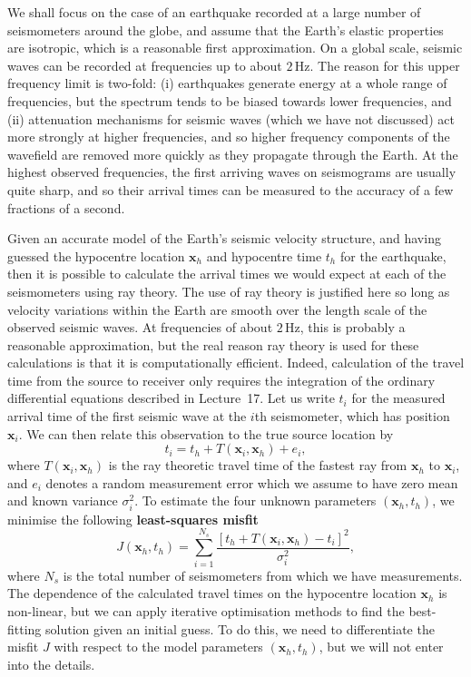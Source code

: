 We shall focus on the case of an earthquake recorded at a large number of seismometers around the globe, and assume that the 
Earth's elastic properties are isotropic, which is a 
reasonable first approximation. On a global scale, seismic waves can be recorded at frequencies up to about $2\,\mathrm{Hz}$. The reason for 
this upper frequency limit is two-fold: (i) earthquakes 
generate energy at a whole range of frequencies, but the spectrum tends to be biased towards lower frequencies, and (ii) attenuation 
mechanisms for seismic waves (which we have not 
discussed) act more strongly at higher frequencies, and so higher frequency components of the wavefield are removed more quickly as 
they propagate through the Earth. At the highest 
observed frequencies, the first arriving waves on seismograms are usually quite sharp, and so their arrival times
 can be measured to the accuracy of a few fractions of a second.

Given an accurate model of the Earth's seismic velocity structure, and having guessed the hypocentre location $\mathbf{x}_{h}$ and 
hypocentre time $t_{h}$ for the earthquake, then it is 
possible to calculate the arrival times we would expect at each of the seismometers using ray theory. The use of ray theory 
is justified here so long as velocity variations 
within the Earth are smooth over the length scale of the observed seismic waves. At frequencies of about $2\,\mathrm{Hz}$, this is probably a 
reasonable approximation, but the real reason 
ray theory is used for these calculations is that it is computationally efficient. Indeed, calculation of the travel time 
from the source to receiver only requires the integration 
of the ordinary differential equations described in Lecture~17. Let us write $t_{i}$ for the measured arrival time of the first 
seismic wave at the $i$th seismometer, which has 
position $\mathbf{x}_{i}$. We can then relate this observation to the true source location by
\begin{equation}
t_{i}=t_{h}+T(\mathbf{x}_{i},\mathbf{x}_{h})+e_{i},
\label{eq:1}
\end{equation}
where $T(\mathbf{x}_{i},\mathbf{x}_{h})$ is the ray theoretic travel time of the fastest ray from $\mathbf{x}_{h}$ to $\mathbf{x}_{i}$, 
and $e_{i}$ denotes a random measurement error which we assume to have zero mean 
and known variance $\sigma_{i}^{2}$. To estimate the four unknown parameters $(\mathbf{x}_{h},t_{h})$, we minimise the following 
\textbf{least-squares misfit}
\begin{equation}
J(\mathbf{x}_h, t_h) = \sum_{i=1}^{N_s} \frac{[t_h + T(\mathbf{x}_i, \mathbf{x}_h) - t_i]^2}{\sigma_i^2},
\label{eq:2}
\end{equation}
where $N_{s}$ is the total number of seismometers from which we have measurements. The dependence of the calculated travel 
times on the hypocentre location $\mathbf{x}_{h}$ is non-linear, but 
we can apply iterative optimisation methods to find the best-fitting solution given an initial guess. To do this, we 
need to differentiate the misfit $J$ with respect to the model 
parameters $(\mathbf{x}_{h},t_{h})$, but we will not enter into the details.


